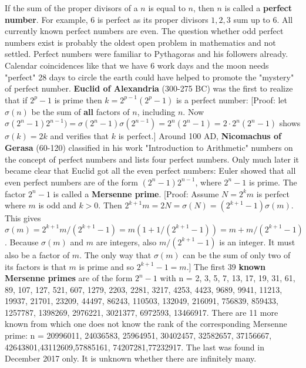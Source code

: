 \documentclass[12pt]{amsart}
\newcounter{example}    \def\example#1{ \item \fontsize{12}{15} \selectfont #1 \fontsize{12}{15} \selectfont }
\begin{document}
If the sum of the proper divisors of a $n$ is equal to $n$, then $n$ is called a 
{\bf perfect number}. For example, $6$ is perfect as
its proper divisors $1,2,3$ sum up to $6$. All currently known perfect numbers
are even. The question whether odd perfect numbers exist is probably the oldest
open problem in mathematics and not settled. Perfect numbers were familiar to Pythagoras and his followers already. 
Calendar coincidences like that we have 6 work days and the moon needs "perfect" 28 days 
to circle the earth could have helped to promote the "mystery" of perfect number. 
{\bf Euclid of Alexandria} (300-275 BC) was the first to realize that if $2^p-1$ is prime then
$k=2^{p-1} (2^p-1)$ is a perfect number:
[Proof: let $\sigma(n)$ be the sum of {\bf all} factors of $n$, including $n$. Now
$\sigma( 2^n-1) 2^{n-1})  = \sigma(2^n-1) \sigma(2^{n-1}) = 2^n (2^n-1) = 2 \cdot 2^n (2^n-1)$
shows $\sigma(k) = 2k$ and verifies that $k$ is perfect.]
Around 100 AD, {\bf Nicomachus of Gerasa} (60-120) classified in his work
"Introduction to Arithmetic" numbers on the concept of perfect numbers and lists four perfect
numbers. 
Only much later it became clear that Euclid got all the even perfect numbers:
Euler showed that all even perfect numbers are of the form $(2^n-1) 2^{n-1}$, where $2^n-1$ is prime.
The factor $2^n-1$ is called a {\bf Mersenne prime}. 
[Proof: Assume $N=2^k m$ is perfect where $m$ is odd and $k>0$. Then
$2^{k+1} m = 2N = \sigma(N) = (2^{k+1}-1) \sigma(m)$.
This gives
$\sigma(m) = 2^{k+1} m/(2^{k+1}-1) = m (1+1/(2^{k+1}-1)) = m + m/(2^{k+1}-1)$.
Because $\sigma(m)$ and $m$ are integers, also $m/(2^{k+1}-1)$ is an integer. It must
also be a factor of $m$. The only way that $\sigma(m)$ can be the sum of only two of its
factors is that $m$ is prime and so $2^{k+1}-1=m$.]
The first 39 {\bf known Mersenne primes} are of the form $2^n-1$ with 
n = 2, 3, 5, 7, 13, 17, 19, 31, 61, 89, 107, 127, 521, 607, 1279, 2203, 2281, 3217, 
4253, 4423, 9689, 9941, 11213, 19937, 21701, 23209, 44497, 86243, 110503, 132049, 
216091, 756839, 859433, 1257787, 1398269, 2976221, 3021377, 6972593, 13466917.
There are 11 more known from which one does not know the rank of the corresponding Mersenne prime:
n = 20996011, 24036583, 25964951, 30402457, 32582657, 37156667, 42643801,43112609,57885161,
74207281,77232917. The last was found in December 2017 only. It is unknown whether there are infinitely many. \\
\end{document}
